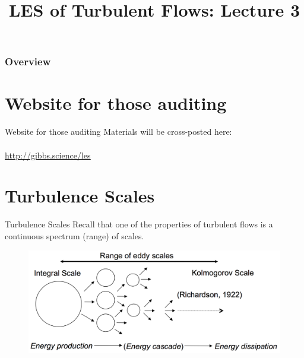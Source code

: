 
\title{LES of Turbulent Flows: Lecture 3}



\begin{frame} 
  \titlepage
\end{frame}


\begin{frame}
\frametitle{Overview}
\tableofcontents
\end{frame}

\section{Website for those auditing} %
\begin{frame}{Website for those auditing}
Materials will be cross-posted here:\\~\\
\href{http://gibbs.science/les}{\color{UUcrimson}\underline{http://gibbs.science/les}}
\end{frame}

\section{Turbulence Scales} %
\begin{frame}{Turbulence Scales}
Recall that one of the properties of turbulent flows is a continuous spectrum (range) of scales.
\begin{figure}
	\includegraphics[width=1\textwidth]{scales.png}
\end{figure}
\end{frame}

